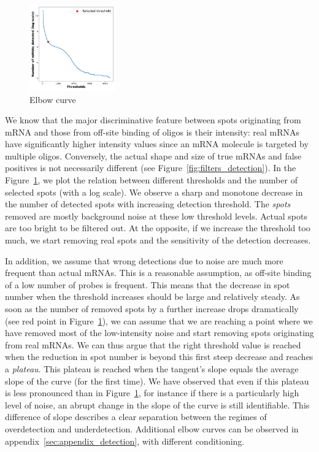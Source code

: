 \begin{figure}
	\begin{center}
		\includegraphics[width=0.33\textwidth]{figures/chapter2/elbow_curve_real}
	\caption[Elbow curve]{Elbow curve}
	\label{fig:elbow_detection}
	\end{center}
\end{figure}

We know that the major discriminative feature between spots originating from \ac{mRNA} and those from off-site binding of oligos is their intensity: real \ac{mRNA}s have significantly higher intensity values since an \ac{mRNA} molecule is targeted by multiple oligos.
Conversely, the actual shape and size of true \ac{mRNA}s and false positives is not necessarily different (see Figure~\ref{fig:filters_detection}).
In the Figure~\ref{fig:elbow_detection}, we plot the relation between different thresholds and the number of selected spots (with a log scale).
We observe a sharp and monotone decrease in the number of detected spots with increasing detection threshold.
The \emph{spots} removed are mostly background noise at these low threshold levels.
Actual spots are too bright to be filtered out.
At the opposite, if we increase the threshold too much, we start removing real spots and the sensitivity of the detection decreases.

In addition, we assume that wrong detections due to noise are much more frequent than actual \ac{mRNA}s.
This is a reasonable assumption, as off-site binding of a low number of probes is frequent.
This means that the decrease in spot number when the threshold increases should be large and relatively steady.
As soon as the number of removed spots by a further increase drops dramatically (see red point in Figure~\ref{fig:elbow_detection}), we can assume that we are reaching a point where we have removed most of the low-intensity noise and start removing spots originating from real \ac{mRNA}s.
We can thus argue that the right threshold value is reached when the reduction in spot number is beyond this first steep decrease and reaches a \emph{plateau}.
This plateau is reached when the tangent's slope equals the average slope of the curve (for the first time).
We have observed that even if this plateau is less pronounced than in Figure~\ref{fig:elbow_detection}, for instance if there is a particularly high level of noise, an abrupt change in the slope of the curve is still identifiable.
This difference of slope describes a clear separation between the regimes of overdetection and underdetection.
Additional elbow curves can be observed in appendix~\ref{sec:appendix_detection}, with different conditioning.\\

